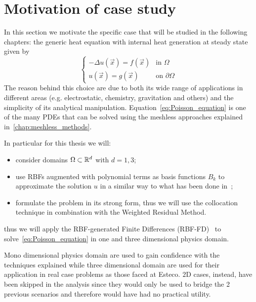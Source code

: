 \section{Motivation of case study}
\label{sec:motivation_of_case_study}
In this section we motivate the specific case that will be studied in the following chapters: the generic heat equation with internal heat generation at steady state given by
\begin{equation}
	\label{eq:Poisson_equation}
	\begin{cases}
		- \Delta u(\vec{x}) = f(\vec{x})														 &  \text{in $\Omega$}							\\
		u(\vec{x}) = g(\vec{x})  																		&  \text{on $\partial\Omega$}
	\end{cases}
\end{equation}
The reason behind this choice are due to both its wide range of applications in different areas	(e.g. electrostatic, chemistry, gravitation and others) and the simplicity of its analytical manipulation. Equation~\eqref{eq:Poisson_equation} is one of the many PDEs that can be solved using the meshless approaches explained in~\ref{chap:meshless_methods}.

In particular for this thesis we will:
\begin{itemize}
	\item consider domains $\Omega \subset \mathbb{R}^{d}$ with $d=1,3$;
	\item use RBFs augmented with polynomial terms as basis functions $B_k$ to approximate the solution $u$ in a similar way to what has been done in~\cite{Liu:Intro_to_meshfree_methods}; 
	\item formulate the problem in its strong form, thus we will use the collocation technique in combination with the Weighted Residual Method.
\end{itemize}
thus we will apply the RBF-generated Finite Differences (RBF-FD)~\cite{Fornberg:RBF-FD_1, Fornberg:RBF-FD_2} to solve~\eqref{eq:Poisson_equation} in one and three dimensional physics domain.

Mono dimensional physics domain are used to gain confidence with the techniques explained while three dimensional  domain are used for their application in real case problems as those faced at Esteco. $2$D cases, instead, have been skipped in the analysis since they would only be used to bridge the 2 previous scenarios and therefore would have had no practical utility.

